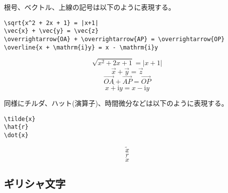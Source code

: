根号、ベクトル、上線の記号は以下のように表現する。
\begin{reidai}
    \begin{verbatim}
\sqrt{x^2 + 2x + 1} = |x+1|
\vec{x} + \vec{y} = \vec{z}
\overrightarrow{OA} + \overrightarrow{AP} = \overrightarrow{OP}
\overline{x + \mathrm{i}y} = x - \mathrm{i}y
\end{verbatim}
\end{reidai}
\vspace*{-1.5em}
\begin{kekka}
    \begin{equation*}
        \sqrt{x^2 + 2x + 1} = |x+1|
    \end{equation*}
    \begin{equation*}
        \vec{x} + \vec{y} = \vec{z}
    \end{equation*}
    \begin{equation*}
        \overrightarrow{OA} + \overrightarrow{AP} = \overrightarrow{OP}
    \end{equation*}
    \begin{equation*}
        \overline{x + \mathrm{i}y} = x - \mathrm{i}y
    \end{equation*}
\end{kekka} \noindent
同様にチルダ、ハット(演算子)、時間微分などは以下のように表現する。
\begin{reidai}
    \begin{verbatim}
\tilde{x}
\hat{r}
\dot{x}
\end{verbatim}
\end{reidai}
\vspace*{-1.5em}
\begin{kekka}
    \begin{equation*}
        \tilde{x}
    \end{equation*}
    \begin{equation*}
        \hat{r}
    \end{equation*}
    \begin{equation*}
        \dot{x}
    \end{equation*}
\end{kekka}

\subsection{ギリシャ文字}
\label{sec:latex:greek}

